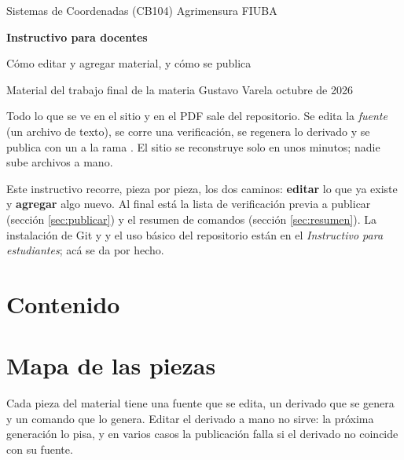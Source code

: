 \documentclass[11pt,a4paper]{report}
\newcommand{\clave}[1]{\texttt{\detokenize{#1}}}
\begin{document}
\apunteCuerpotrue

\begin{center}
  {\color{muted}\large Sistemas de Coordenadas (CB104) \textperiodcentered{} Agrimensura \textperiodcentered{} FIUBA}\par\medskip
  {\color{tealdark}\Huge\bfseries Instructivo para docentes}\par\medskip
  {\Large Cómo editar y agregar material, y cómo se publica}\par\bigskip
  {\color{muted} Material del trabajo final de la materia \textperiodcentered{} Gustavo Varela \textperiodcentered{} octubre de 2026}
\end{center}

\begin{idea}
Todo lo que se ve en el sitio y en el PDF sale del repositorio. Se edita la \emph{fuente} (un archivo de texto), se corre una verificación, se regenera lo derivado y se publica con un \clave{git push} a la rama \clave{main}. El sitio se reconstruye solo en unos minutos; nadie sube archivos a mano.

Este instructivo recorre, pieza por pieza, los dos caminos: \textbf{editar} lo que ya existe y \textbf{agregar} algo nuevo. Al final está la lista de verificación previa a publicar (sección \ref{sec:publicar}) y el resumen de comandos (sección \ref{sec:resumen}). La instalación de Git y \clave{uv} y el uso básico del repositorio están en el \emph{Instructivo para estudiantes}; acá se da por hecho.
\end{idea}

\makeatletter
\section*{Contenido}
\makeatother

\section{Mapa de las piezas}\label{sec:mapa}

Cada pieza del material tiene una fuente que se edita, un derivado que se genera y un comando que lo genera. Editar el derivado a mano no sirve: la próxima generación lo pisa, y en varios casos la publicación falla si el derivado no coincide con su fuente.
\end{document}
